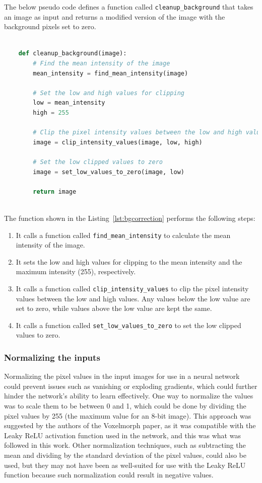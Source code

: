 \documentclass{report}
\begin{document}
	The below pseudo code defines a function called \texttt{cleanup\_background} that takes an image as input and returns a modified version of the image with the background pixels set to zero.
	
	\begin{lstlisting}[language=python, label=lst:bgcorrection]

	def cleanup_background(image):
		# Find the mean intensity of the image
		mean_intensity = find_mean_intensity(image)
	
		# Set the low and high values for clipping
		low = mean_intensity
		high = 255
	
		# Clip the pixel intensity values between the low and high values
		image = clip_intensity_values(image, low, high)
	
		# Set the low clipped values to zero
		image = set_low_values_to_zero(image, low)
	
		return image
	
	\end{lstlisting}	
	
	The function shown in the Listing~\ref{lst:bgcorrection} performs the following steps:
	
	\begin{enumerate}
		\item It calls a function called \texttt{find\_mean\_intensity} to calculate the mean intensity of the image.
		\item It sets the low and high values for clipping to the mean intensity and the maximum intensity (255), respectively.
		\item It calls a function called \texttt{clip\_intensity\_values} to clip the pixel intensity values between the low and high values. Any values below the low value are set to zero, while values above the low value are kept the same.
		\item It calls a function called \texttt{set\_low\_values\_to\_zero} to set the low clipped values to zero.
	\end{enumerate}
	
	\subsubsection{Normalizing the inputs}
	Normalizing the pixel values in the input images for use in a neural network could prevent issues such as vanishing or exploding gradients, which could further hinder the network's ability to learn effectively. One way to normalize the values was to scale them to be between 0 and 1, which could be done by dividing the pixel values by 255 (the maximum value for an 8-bit image). This approach was suggested by the authors of the Voxelmorph paper, as it was compatible with the Leaky ReLU activation function used in the network, and this was what was followed in this work. Other normalization techniques, such as subtracting the mean and dividing by the standard deviation of the pixel values, could also be used, but they may not have been as well-suited for use with the Leaky ReLU function because such normalization could result in negative values.
	
\end{document}
